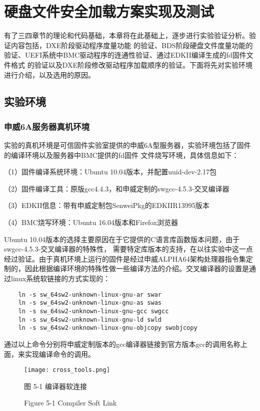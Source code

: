 %
%
\chapter{硬盘文件安全加载方案实现及测试}
有了三四章节的理论和代码基础，本章将在此基础上，逐步进行实验验证分析。验证内容包括，DXE阶段驱动程序度量功能
的验证、BDS阶段硬盘文件度量功能的验证、UEFI系统中BMC驱动程序的连通性验证、通过EDKII编译生成的fd固件文件格式
的验证以及DXE阶段修改驱动程序加载顺序的验证。下面将先对实验环境进行介绍，以及选用的原因。

%
%
\section{实验环境}

\subsection{申威6A服务器真机环境}
实验的真机环境是可信固件实验室提供的申威6A型服务器，实验环境包括了固件的编译环境以及服务器中BMC提供的fd固件
文件烧写环境，具体信息如下：
\par （1）固件编译系统环境：Ubuntu 10.04版本，并配置uuid-dev-2.17包
\par （2）固件编译工具：原版gcc4.4.3，和申威定制的swgcc-4.5.3-交叉编译器
\par （3）EDKII信息：带有申威定制包SenweiPkg的EDKIIR13995版本
\par （4）BMC烧写环境：Ubuntu 16.04版本和Firefox浏览器
\par Ubuntu 10.04版本的选择主要原因在于它提供的C语言库函数版本问题，由于swgcc-4.5.3-交叉编译器的特殊性，
需要特定库版本的支持，在以往实验中这一点经过验证。由于真机环境上运行的固件是经过申威ALPHA64架构处理器指令集定
制的，因此根据编译环境的特殊性做一些编译方法的介绍。交叉编译器的设置是通过linux系统软链接的方式实现的：

\begin{lstlisting}
    ln -s sw_64sw2-unknown-linux-gnu-ar swar
    ln -s sw_64sw2-unknown-linux-gnu-as swas
    ln -s sw_64sw2-unknown-linux-gnu-gcc swgcc
    ln -s sw_64sw2-unknown-linux-gnu-ld swld
    ln -s sw_64sw2-unknown-linux-gnu-objcopy swobjcopy    
\end{lstlisting}

通过以上命令分别将申威定制版本的gcc编译器链接到官方版本gcc的调用名称上面，来实现编译命令的调用。

\begin{figure}[htb]
    \vspace{0cm}   
    \setlength{\abovecaptionskip}{0.3cm}
	\centering
    \texttt{[image: cross\_tools.png]}
    \caption*{图 5-1 编译器软连接}
    \setlength{\belowcaptionskip}{-0.7cm}
    \caption*{Figure 5-1 Compiler Soft Link}
\end{figure}

